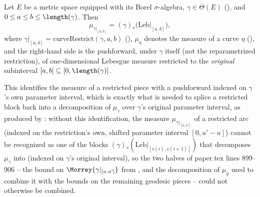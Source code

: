 \begin{lemma}
  Let $E$ be a metric space equipped with its Borel $\sigma$-algebra, $\gamma \in \Theta(E)$
  (), and $0 \le a \le b \le \length(\gamma)$. Then
  \[
    \mu_{\gamma|_{[a,b]}} = (\gamma)_{*}\bigl(\mathrm{Leb}|_{[a,b]}\bigr)
    ,
  \]
  where $\gamma|_{[a,b]} = \mathrm{curveRestrict}(\gamma,a,b)$ (), $\mu_\eta$
  denotes the measure of a curve $\eta$ (), and the right-hand side is the
  pushforward, under $\gamma$ itself (not the reparametrized restriction), of one-dimensional
  Lebesgue measure restricted to the \emph{original} subinterval $[a,b] \subseteq [0,\length(\gamma)]$.

  This identifies the measure of a restricted piece with a pushforward indexed on $\gamma$'s own
  parameter interval, which is exactly what is needed to splice a restricted block back into a
  decomposition of $\mu_\gamma$ over $\gamma$'s original parameter interval, as produced by
  : without this identification, the measure
  $\mu_{\gamma|_{[u,u']}}$ of a restricted arc (indexed on the restriction's own, shifted parameter
  interval $[0,u'-u]$) cannot be recognized as one of the blocks
  $(\gamma)_*(\mathrm{Leb}|_{[s(i),s(i+1)]})$ that  decomposes
  $\mu_\gamma$ into (indexed on $\gamma$'s original interval), so the two halves of paper.tex
  lines 899--906 -- the bound on $\Morrey{\gamma|_{[u,u']}}$ from , and the
  decomposition of $\mu_g$ used to combine it with the bounds on the remaining geodesic
  pieces -- could not otherwise be combined.
\end{lemma}
